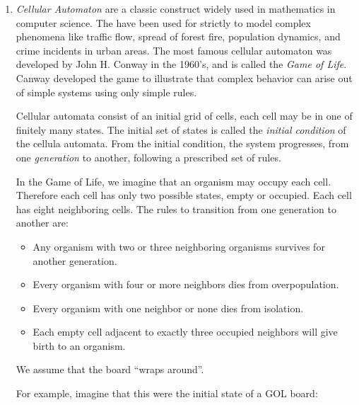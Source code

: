 \documentclass{article}
\begin{document}
\begin{enumerate}
\item \textit{Cellular Automaton} are a classic construct widely used
  in mathematics in computer science.  The have been used for strictly to model complex phenomena like traffic flow, spread of
  forest fire, population dynamics, and crime incidents in urban areas. The most famous
  cellular automaton was developed by John H. Conway in the 1960's,
  and is called the \textit{Game of Life}.
  Canway developed the game to illustrate that complex behavior can arise out of
  simple systems using only simple rules.  

  Cellular automata consist of an initial grid of cells, each cell may
  be in one of finitely many states.  The initial set of states is
  called the \textit{initial condition} of the cellula automata.  From
  the initial condition, the system progresses, from one
  \textit{generation} to another, following a prescribed set of rules. 

  In the Game of Life, we imagine that an organism may occupy each
  cell.  Therefore each cell has only two possible states, empty or
  occupied.  Each cell has eight neighboring cells.  The rules to
  transition from one generation to another are:
  \begin{itemize}
  \item Any organism with two or three neighboring organisms survives
    for another generation.
  \item Every organism with four or more neighbors dies from
    overpopulation.
  \item Every organism with one neighbor or none dies from isolation.
  \item Each empty cell adjacent to exactly three occupied neighbors
    will give birth to an organism. 
  \end{itemize}

  We assume that the board ``wraps around''. 

  For example, imagine that this were the initial state of a GOL
  board:


\end{enumerate}
\end{document}
